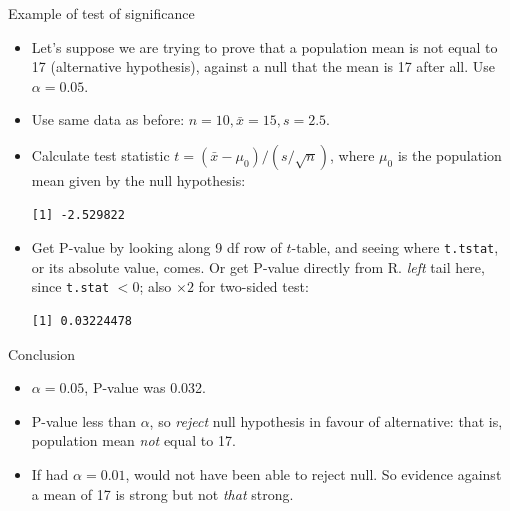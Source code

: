 \begin{frame}[fragile]{Example of test of significance}
  
  
  \begin{itemize}
  \item   Let's suppose we are trying to prove that a population mean is not
  equal to 17 (alternative hypothesis), against a null that the mean
  is 17 after all. Use $\alpha=0.05$.
\item Use same data as before: $n=10, \bar{x}=15, s=2.5$.
\item Calculate test statistic $t=(\bar{x}-\mu_0)/(s/\sqrt{n})$, where
  $\mu_0$ is the population mean given by the null hypothesis:
\begin{knitrout}
\color{fgcolor}\begin{kframe}
\begin{alltt}
\hlkwb{=}\hlstd{(}\hlopt{-}\hlstd{)}\hlopt{/}\hlstd{(}\hlopt{/}\hlstd{(}
\end{alltt}
\begin{verbatim}
[1] -2.529822
\end{verbatim}
\end{kframe}
\end{knitrout}
\item Get P-value by looking along 9 df row of $t$-table, and seeing
  where \texttt{t.tstat}, or its absolute value, comes. Or get P-value
  directly from R. \emph{left} tail here, since
  \texttt{t.stat} $<0$; also $\times 2$ for
  two-sided test:
\begin{knitrout}
\color{fgcolor}\begin{kframe}
\begin{alltt}
\hlopt{*}\hlstd{)}
\end{alltt}
\begin{verbatim}
[1] 0.03224478
\end{verbatim}
\end{kframe}
\end{knitrout}
  \end{itemize}
  
\end{frame}

\begin{frame}[fragile]{Conclusion}
  
  \begin{itemize}
  \item $\alpha=0.05$, P-value was 0.032.
  \item P-value less than $\alpha$, so \emph{reject} null hypothesis
    in favour of alternative: that is, population mean \emph{not} equal to 17.
  \item If had $\alpha=0.01$, would not have been able to reject
    null. So evidence against a mean of 17 is strong but not
    \emph{that} strong.
  \end{itemize}
\end{frame}


